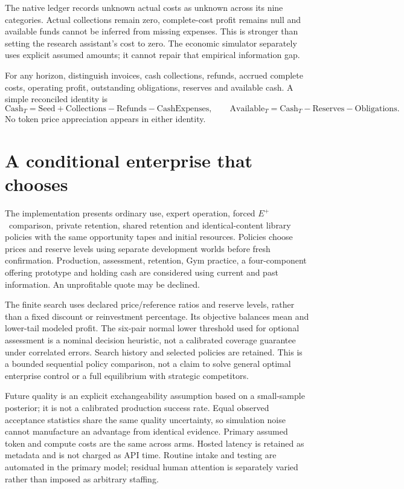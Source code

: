 \documentclass[11pt,letterpaper]{article}
\newcommand{\Eplus}{\ensuremath{E^{+}}}
\begin{document}
The native ledger records unknown actual costs as unknown across its nine categories. Actual collections remain zero, complete-cost profit remains null and available funds cannot be inferred from missing expenses. This is stronger than setting the research assistant's cost to zero. The economic simulator separately uses explicit assumed amounts; it cannot repair that empirical information gap.

For any horizon, distinguish invoices, cash collections, refunds, accrued complete costs, operating profit, outstanding obligations, reserves and available cash. A simple reconciled identity is
\[
\mathrm{Cash}_{T}=\mathrm{Seed}+\mathrm{Collections}-\mathrm{Refunds}-\mathrm{CashExpenses},\qquad
\mathrm{Available}_{T}=\mathrm{Cash}_{T}-\mathrm{Reserves}-\mathrm{Obligations}.
\]
No token price appreciation appears in either identity.

\section{A conditional enterprise that chooses}
The implementation presents ordinary use, expert operation, forced \Eplus\ comparison, private retention, shared retention and identical-content library policies with the same opportunity tapes and initial resources. Policies choose prices and reserve levels using separate development worlds before fresh confirmation. Production, assessment, retention, Gym practice, a four-component offering prototype and holding cash are considered using current and past information. An unprofitable quote may be declined.

The finite search uses declared price/reference ratios and reserve levels, rather than a fixed discount or reinvestment percentage. Its objective balances mean and lower-tail modeled profit. The six-pair normal lower threshold used for optional assessment is a nominal decision heuristic, not a calibrated coverage guarantee under correlated errors. Search history and selected policies are retained. This is a bounded sequential policy comparison, not a claim to solve general optimal enterprise control or a full equilibrium with strategic competitors.

Future quality is an explicit exchangeability assumption based on a small-sample posterior; it is not a calibrated production success rate. Equal observed acceptance statistics share the same quality uncertainty, so simulation noise cannot manufacture an advantage from identical evidence. Primary assumed token and compute costs are the same across arms. Hosted latency is retained as metadata and is not charged as API time. Routine intake and testing are automated in the primary model; residual human attention is separately varied rather than imposed as arbitrary staffing.
\end{document}
